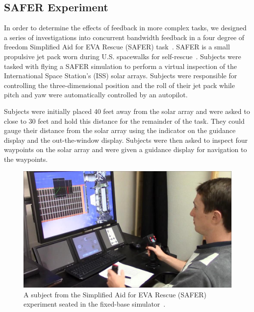 \subsection{SAFER Experiment} \label{safersection}
In order to determine the effects of feedback in more complex tasks, we designed a series of investigations into concurrent bandwidth feedback in a four degree of freedom Simplified Aid for EVA Rescue (SAFER) task~\citep{karasinski_real-time_2016,karasinski_development_2016,karasinski_real-time_2017}.
SAFER is a small propulsive jet pack worn during U.S. spacewalks for self-rescue~\citep{Vassigh1998}.
Subjects were tasked with flying a SAFER simulation to perform a virtual inspection of the International Space Station's (ISS) solar arrays.
Subjects were responsible for controlling the three-dimensional position and the roll of their jet pack while pitch and yaw were automatically controlled by an autopilot.

Subjects were initially placed 40 feet away from the solar array and were asked to close to 30 feet and hold this distance for the remainder of the task.
They could gauge their distance from the solar array using the indicator on the guidance display and the out-the-window display.
Subjects were then asked to inspect four waypoints on the solar array and were given a guidance display for navigation to the waypoints.

\begin{figure}[tb!]
    \begin{center}
        \includegraphics[width=\linewidth]{figures/AR/SAFER_DangerChris.jpg}
        \caption[Simplified Aid for EVA Rescue (SAFER) experiment subject seated in the fixed-base simulator]{A subject from the Simplified Aid for EVA Rescue (SAFER) experiment seated in the fixed-base simulator~\citep{karasinski_real-time_2016}.}
        \label{figure:safersim}
    \end{center}
\end{figure}

